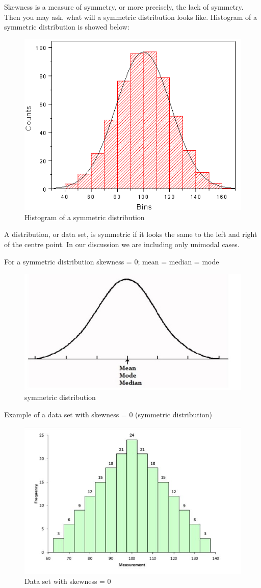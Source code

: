 \documentclass[
]{book}
\begin{document}
Skewness is a measure of symmetry, or more precisely, the lack of
symmetry. Then you may ask, what will a symmetric distribution looks
like. Histogram of a symmetric distribution is showed below:

\begin{figure}

{\centering \includegraphics[width=0.5\linewidth]{images/Hist1} 

}

\caption{Histogram of a symmetric distribution}\label{fig:hs}
\end{figure}

A distribution, or data set, is symmetric if it looks the same to the
left and right of the centre point. In our discussion we are including
only unimodal cases.

For a symmetric distribution skewness = 0; mean = median = mode

\begin{figure}

{\centering \includegraphics[width=0.5\linewidth]{images/image3_5} 

}

\caption{symmetric distribution}\label{fig:hs1}
\end{figure}

Example of a data set with skewness = 0 (symmetric distribution)

\begin{figure}

{\centering \includegraphics[width=0.5\linewidth]{images/image4_5} 

}

\caption{Data set with skewness = 0}\label{fig:sk0}
\end{figure}
\end{document}
